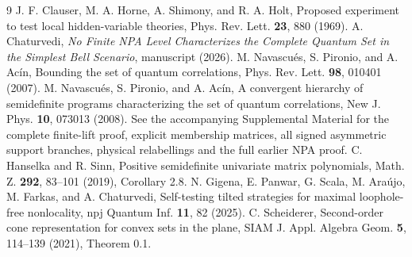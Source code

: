 \documentclass[aps,prl,reprint,superscriptaddress,nofootinbib,longbibliography]{revtex4-2}
\begin{document}
\begin{thebibliography}{9}
 J. F. Clauser, M. A. Horne, A. Shimony, and R. A. Holt,
Proposed experiment to test local hidden-variable theories,
Phys. Rev. Lett. \textbf{23}, 880 (1969).
 A. Chaturvedi, \emph{No Finite NPA Level Characterizes
the Complete Quantum Set in the Simplest Bell Scenario}, manuscript (2026).
 M. Navascu\'es, S. Pironio, and A. Ac\'in,
Bounding the set of quantum correlations, Phys. Rev. Lett.
\textbf{98}, 010401 (2007).
 M. Navascu\'es, S. Pironio, and A. Ac\'in,
A convergent hierarchy of semidefinite programs characterizing the set
of quantum correlations, New J. Phys. \textbf{10}, 073013 (2008).
 See the accompanying Supplemental Material for the complete
finite-lift proof, explicit membership matrices, all signed asymmetric
support branches, physical relabellings and the full earlier NPA proof.
 C. Hanselka and R. Sinn,
Positive semidefinite univariate matrix polynomials,
Math. Z. \textbf{292}, 83--101 (2019), Corollary 2.8.
 N. Gigena, E. Panwar, G. Scala, M. Ara\'ujo,
M. Farkas, and A. Chaturvedi, Self-testing tilted strategies for maximal
loophole-free nonlocality, npj Quantum Inf. \textbf{11}, 82 (2025).
 C. Scheiderer, Second-order cone representation
for convex sets in the plane, SIAM J. Appl. Algebra Geom.
\textbf{5}, 114--139 (2021), Theorem 0.1.
\end{thebibliography}
\end{document}
